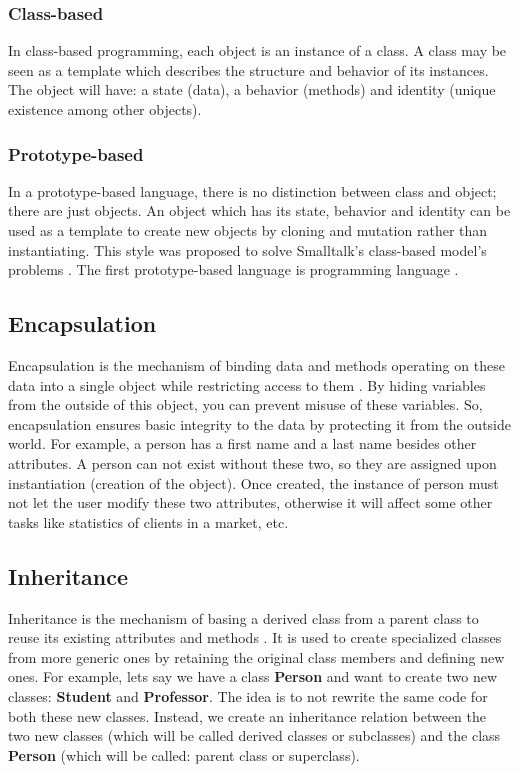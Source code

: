 \documentclass[12pt]{book}
\begin{document}
\subsubsection{Class-based}

In class-based programming, each object is an instance of a class. 
A class may be seen as a template which describes the structure and behavior of its instances.
The object will have: a state (data), a behavior (methods) and identity (unique existence among other objects).

\subsubsection{Prototype-based}

In a prototype-based language, there is no distinction between class and object; there are just objects. 
An object which has its state, behavior and identity can be used as a template to create new objects by cloning and mutation rather than instantiating.
This style was proposed to solve Smalltalk's class-based model's problems \citep{1986-borning}.
The first prototype-based language is  programming language \citep{1991-ungar}.

\subsection{Encapsulation}

Encapsulation is the mechanism of binding data and methods operating on these data into a single object while restricting access to them \citep{2017-janssen-enc}. 
By hiding variables from the outside of this object, you can prevent misuse of these variables.
So, encapsulation ensures basic integrity to the data by protecting it from the outside world.
For example, a person has a first name and a last name besides other attributes. 
A person can not exist without these two, so they are assigned upon instantiation (creation of the object). 
Once created, the instance of person must not let the user modify these two attributes, otherwise it will affect some other tasks like statistics of clients in a market, etc. 


\subsection{Inheritance}

Inheritance is the mechanism of basing a derived class from a parent class to reuse its existing attributes and methods \citep{2016-techdifferences}. 
It is used to create specialized classes from more generic ones by retaining the original class members and defining new ones. 
For example, lets say we have a class \textbf{Person} and want to create two new classes: \textbf{Student} and \textbf{Professor}. 
The idea is to not rewrite the same code for both these new classes. 
Instead, we create an inheritance relation between the two new classes (which will be called derived classes or subclasses) and the class \textbf{Person} (which will be called: parent class or superclass). 
\end{document}
